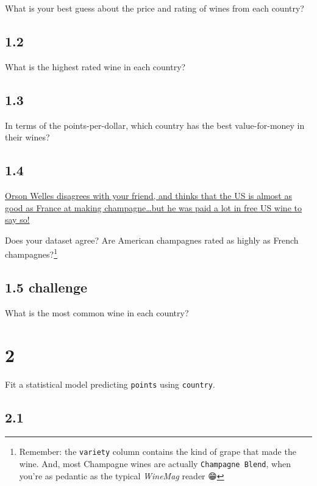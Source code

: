 \documentclass[]{tufte-handout}
\begin{document}
What is your best guess about the price and rating of wines from each
country?

\hypertarget{section}{%
\subsection{1.2}\label{section}}

What is the highest rated wine in each country?

\hypertarget{section-1}{%
\subsection{1.3}\label{section-1}}

In terms of the points-per-dollar, which country has the best
value-for-money in their wines?

\hypertarget{section-2}{%
\subsection{1.4}\label{section-2}}

\href{https://www.youtube.com/watch?v=Nvxwf1jxdaM}{Orson Welles
disagrees with your friend, and thinks that the US is almost as good as
France at making champagne\ldots but he was paid a lot in free US wine
to say so!}

Does your dataset agree? Are American champagnes rated as highly as
French champagnes?\footnote{Remember: the \texttt{variety} column
  contains the kind of grape that made the wine. And, most Champagne
  wines are actually \texttt{Champagne\ Blend}, when you're as pedantic
  as the typical \emph{WineMag} reader 😁}

\hypertarget{challenge}{%
\subsection{\texorpdfstring{1.5
\textbf{challenge}}{1.5 challenge}}\label{challenge}}

What is the most common wine in each country?

\hypertarget{section-3}{%
\section{2}\label{section-3}}

Fit a statistical model predicting \texttt{points} using
\texttt{country}.

\hypertarget{section-4}{%
\subsection{2.1}\label{section-4}}
\end{document}
